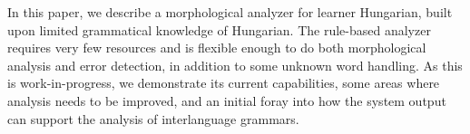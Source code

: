 In this paper, we describe a morphological analyzer for learner Hungarian, built upon limited grammatical knowledge of Hungarian. The rule-based analyzer requires very few resources and is flexible enough to do both morphological analysis and error detection, in addition to some unknown word handling.  As this is work-in-progress, we demonstrate its current capabilities, some areas where analysis needs to be improved, and an initial foray into how the system output can support the analysis of interlanguage grammars.
